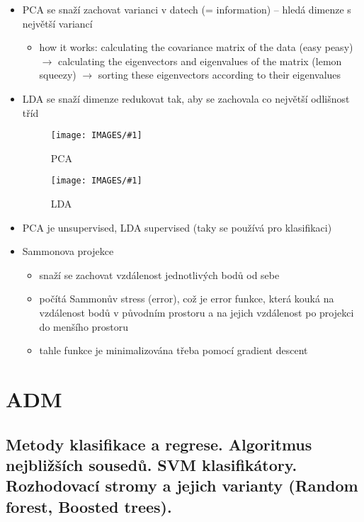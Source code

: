 \documentclass[a4paper,hidelinks]{article}
\newcommand{\myimagesuperbig}[1] {\texttt{[image: IMAGES/\#1]}}
\begin{document}
\begin{itemize}
    \item PCA se snaží zachovat varianci v datech (= information) -- hledá dimenze s největší variancí
    \begin{itemize}
        \item how it works: calculating the covariance matrix of the data (easy peasy) $\to$ calculating the eigenvectors and eigenvalues of the matrix (lemon squeezy) $\to$ sorting these eigenvectors according to their eigenvalues   
    \end{itemize}
    \item LDA se snaží dimenze redukovat tak, aby se zachovala co největší odlišnost tříd
    \begin{figure}
        \centering
        \begin{minipage}{0.45\textwidth}
        \myimagesuperbig{PCA}
        \caption{PCA}
        \label{fig:PCA}
        \end{minipage}%
        \hfill
        \begin{minipage}{0.45\textwidth}
        \myimagesuperbig{LDA}
        \caption{LDA}
        \label{fig:LDA}
        \end{minipage}
    \end{figure}
    \item PCA je unsupervised, LDA supervised (taky se používá pro klasifikaci)
    \item Sammonova projekce 
    \begin{itemize}
        \item snaží se zachovat vzdálenost jednotlivých bodů od sebe
        \item počítá Sammonův stress (error), což je error funkce, která kouká na vzdálenost bodů v původním prostoru a na jejich vzdálenost po projekci do menšího prostoru
        \item tahle funkce je minimalizována třeba pomocí gradient descent
    \end{itemize}
\end{itemize}

\section{ADM}

\subsection{Metody klasifikace a regrese. Algoritmus nejbližších sousedů. SVM klasifikátory. Rozhodovací stromy a jejich varianty (Random forest, Boosted trees).}
\end{document}
